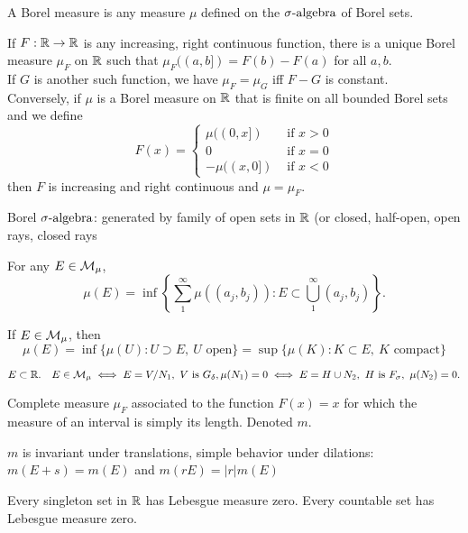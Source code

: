 \begin{dfn}A Borel measure is any measure $\mu$ defined on the ${\sigma}\text{-algebra}$ of Borel sets. 
\end{dfn}

\begin{thm} If $F: {\mathbb R} \rightarrow {\mathbb R}$ is any increasing, right continuous function, there is a unique Borel measure $\mu_F$ on ${\mathbb R}$ such that $\mu_F((a,b])=F(b)-F(a)$ for all $a,b$. \\
If $G$ is another such function, we have $\mu_F= \mu_G$ iff $F-G$ is constant.\\
Conversely, if $\mu$ is a Borel measure on ${\mathbb R}$ that is finite on all bounded Borel sets and we define
\[ F(x) = \left\{
\begin{array}{ll}
	\mu((0, x]) & \text{ if } x>0\\
	0 & \text{ if } x=0\\
	-\mu((x, 0]) & \text{ if } x<0
\end{array} \right. 
\]	
then $F$ is increasing and right continuous and $\mu=\mu_F$.
\end{thm}

\begin{dfn}[$\B_\R$]
	Borel ${\sigma}\text{-algebra}$: generated by family of open sets in ${\mathbb R}$ (or closed, half-open, open rays, closed rays
\end{dfn}

\begin{dfn}
	For any $E \in {\mathcal M}_\mu$, \[
	\mu(E) = \inf \left\{ \sum_1^\infty \mu((a_j, b_j)): E \subset  \bigcup_1^\infty (a_j, b_j)  \right\}.
	\]
\end{dfn}

\begin{thm}
If $E \in {\mathcal M}_\mu$, then \[
\mu(E) = \inf \{ \mu(U): U \supset E, \ U \text{ open} \} = \sup \{ \mu(K) : K \subset E, \ K \text{ compact} \}
\]
\end{thm}

\begin{thm}
\[
E \subset {\mathbb R}. \quad E \in {\mathcal M}_\mu \iff E = V \slash N_1, \ V \text{ is }  G_\delta, \mu(N_1)= 0 \iff E = H \cup N_2, \ H \text{ is }  F_\sigma, \ \mu(N_2)=0.
\]	
\end{thm}

\begin{dfn}
	Complete measure $\mu_F$ associated to the function $F(x) = x$ for which the measure of an interval is simply its length. Denoted $m$.
\end{dfn}
\begin{rmk}
$m$ is invariant under translations, simple behavior under dilations: $m(E + s) = m(E)$ and $m(rE) = |r|m(E)$	
\end{rmk}

\begin{rmk}
Every singleton set in ${\mathbb R} $ has Lebesgue measure zero.	Every countable set has Lebesgue measure zero. 
\end{rmk}






